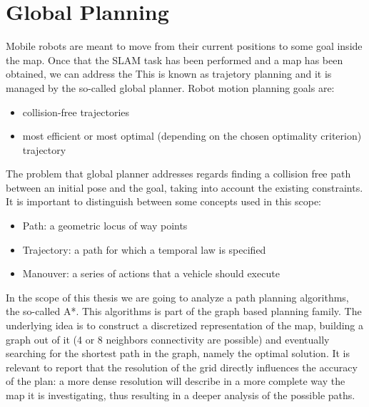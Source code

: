 \section{Global Planning}
Mobile robots are meant to move from their current positions to some goal inside the map.
Once that the SLAM task has been performed and a map has been obtained, we can address the This is known as trajetory planning and it is managed by the so-called global planner.
Robot motion planning goals are:
\begin{itemize}
    \item collision-free trajectories
    \item most efficient or most optimal (depending on the chosen optimality criterion) trajectory
\end{itemize}
The problem that global planner addresses regards finding a collision free path between an initial pose and the goal, taking into account the existing constraints.
It is important to distinguish between some concepts used in this scope:
\begin{itemize}
    \item Path: a geometric locus of way points
    \item Trajectory: a path for which a temporal law is specified
    \item Manouver: a series of actions that a vehicle should execute
\end{itemize}

In the scope of this thesis we are going to analyze a path planning algorithms, the so-called A*.
This algorithms is part of the graph based planning family.
The underlying idea is to construct a discretized representation of the map, building a graph out of it (4 or 8 neighbors connectivity are possible) and eventually searching for the shortest path in the graph, namely the optimal solution. It is relevant to report that the resolution of the grid directly influences the accuracy of the plan: a more dense resolution will describe in a more complete way the map it is investigating, thus resulting in a deeper analysis of the possible paths.

